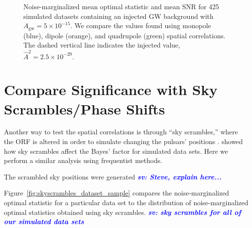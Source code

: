 \documentclass[twocolumn,aps,prd,superscriptaddress]{revtex4-1}
\newcommand{\sv}[1]{\textcolor{blue}{\it{\textbf{sv: #1}}} }
\newcommand{\Agw}{\ensuremath{A_\mathrm{gw}}}
\begin{document}
\begin{figure}[ht]
	\caption{Noise-marginalized mean optimal statistic and mean SNR for 425 simulated datasets 
			containing an injected GW background with $\Agw = 5\times10^{-15}$. 
			We compare the values found using monopole (blue), dipole (orange), and quadrupole (green) 
			spatial correlations. 
			The dashed vertical line indicates the injected value, $\hat{A}^2 = 2.5 \times 10^{-29}$.}
	\label{fig:os_ORF}
\end{figure}


\section{Compare Significance with Sky Scrambles/Phase Shifts}
\label{sec:skyscrambles}

Another way to test the spatial correlations is through ``sky scrambles,'' 
where the ORF is altered in order to simulate changing the pulsars' positions \citep{cs2016}. 
\citet{tlb+2017} showed how sky scrambles affect the Bayes' factor for simulated data sets. 
Here we perform a similar analysis using frequentist methods.

The scrambled sky positions were generated \sv{Steve, explain here...}

Figure~\ref{fig:skyscrambles_dataset_sample} compares the noise-marginalized optimal statistic 
for a particular data set to the 
distribution of noise-marginalized optimal statistics obtained using sky scrambles.
\sv{sky scrambles for all of our simulated data sets}
\end{document}
